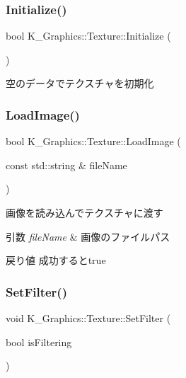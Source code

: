 \subsubsection{\texorpdfstring{Initialize()}{Initialize()}}
{\footnotesize\ttfamily bool K\+\_\+\+Graphics\+::\+Texture\+::\+Initialize (\begin{DoxyParamCaption}{ }\end{DoxyParamCaption})}



空のデータでテクスチャを初期化 

\mbox{\label{class_k___graphics_1_1_texture_a3f4839ab22e8a2e9aeb58ae49509f73d}} 
\subsubsection{\texorpdfstring{Load\+Image()}{LoadImage()}}
{\footnotesize\ttfamily bool K\+\_\+\+Graphics\+::\+Texture\+::\+Load\+Image (\begin{DoxyParamCaption}\item[{const std\+::string \&}]{file\+Name }\end{DoxyParamCaption})}



画像を読み込んでテクスチャに渡す 


\begin{DoxyParams}{引数}
{\em file\+Name} & 画像のファイルパス \\
\hline
\end{DoxyParams}
\begin{DoxyReturn}{戻り値}
成功するとtrue 
\end{DoxyReturn}
\mbox{\label{class_k___graphics_1_1_texture_ada11b0ac5f51e73ca07dc2a69fb32e3c}} 
\subsubsection{\texorpdfstring{Set\+Filter()}{SetFilter()}}
{\footnotesize\ttfamily void K\+\_\+\+Graphics\+::\+Texture\+::\+Set\+Filter (\begin{DoxyParamCaption}\item[{bool}]{is\+Filtering }\end{DoxyParamCaption})}



